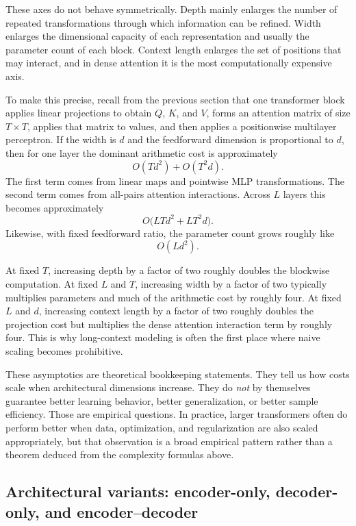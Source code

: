 These axes do not behave symmetrically.
Depth mainly enlarges the number of repeated transformations through which information can be refined.
Width enlarges the dimensional capacity of each representation and usually the parameter count of each block.
Context length enlarges the set of positions that may interact, and in dense attention it is the most computationally expensive axis.

To make this precise, recall from the previous section that one transformer block applies linear projections to obtain \(Q\), \(K\), and \(V\), forms an attention matrix of size \(T \times T\), applies that matrix to values, and then applies a positionwise multilayer perceptron.
If the width is \(d\) and the feedforward dimension is proportional to \(d\), then for one layer the dominant arithmetic cost is approximately
\[
O(Td^2) + O(T^2 d).
\]
The first term comes from linear maps and pointwise MLP transformations.
The second term comes from all-pairs attention interactions.
Across \(L\) layers this becomes approximately
\[
O\bigl(LTd^2 + LT^2 d\bigr).
\]
Likewise, with fixed feedforward ratio, the parameter count grows roughly like
\[
O(Ld^2).
\]

\begin{remark}
At fixed \(T\), increasing depth by a factor of two roughly doubles the blockwise computation.
At fixed \(L\) and \(T\), increasing width by a factor of two typically multiplies parameters and much of the arithmetic cost by roughly four.
At fixed \(L\) and \(d\), increasing context length by a factor of two roughly doubles the projection cost but multiplies the dense attention interaction term by roughly four.
This is why long-context modeling is often the first place where naive scaling becomes prohibitive.
\end{remark}

These asymptotics are theoretical bookkeeping statements.
They tell us how costs scale when architectural dimensions increase.
They do \emph{not} by themselves guarantee better learning behavior, better generalization, or better sample efficiency.
Those are empirical questions.
In practice, larger transformers often do perform better when data, optimization, and regularization are also scaled appropriately, but that observation is a broad empirical pattern rather than a theorem deduced from the complexity formulas above.

\subsection*{Architectural variants: encoder-only, decoder-only, and encoder--decoder}

